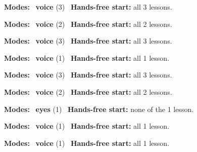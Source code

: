 \expandafter\def\csname hlchaptermodality105\endcsname{%
  {\small\noindent
    \textbf{Modes:} \hlvoicesign{}~\textbf{voice} (3)\quad
    \hlvoicesign{}~\textbf{Hands-free start:} all 3 lessons.%
    \par}\medskip
}

\expandafter\def\csname hlchaptermodality106\endcsname{%
  {\small\noindent
    \textbf{Modes:} \hlvoicesign{}~\textbf{voice} (2)\quad
    \hlvoicesign{}~\textbf{Hands-free start:} all 2 lessons.%
    \par}\medskip
}

\expandafter\def\csname hlchaptermodality107\endcsname{%
  {\small\noindent
    \textbf{Modes:} \hlvoicesign{}~\textbf{voice} (3)\quad
    \hlvoicesign{}~\textbf{Hands-free start:} all 3 lessons.%
    \par}\medskip
}

\expandafter\def\csname hlchaptermodality108\endcsname{%
  {\small\noindent
    \textbf{Modes:} \hlvoicesign{}~\textbf{voice} (1)\quad
    \hlvoicesign{}~\textbf{Hands-free start:} all 1 lesson.%
    \par}\medskip
}

\expandafter\def\csname hlchaptermodality109\endcsname{%
  {\small\noindent
    \textbf{Modes:} \hlvoicesign{}~\textbf{voice} (3)\quad
    \hlvoicesign{}~\textbf{Hands-free start:} all 3 lessons.%
    \par}\medskip
}

\expandafter\def\csname hlchaptermodality110\endcsname{%
  {\small\noindent
    \textbf{Modes:} \hlvoicesign{}~\textbf{voice} (2)\quad
    \hlvoicesign{}~\textbf{Hands-free start:} all 2 lessons.%
    \par}\medskip
}

\expandafter\def\csname hlchaptermodality111\endcsname{%
  {\small\noindent
    \textbf{Modes:} \hlsightsign{}~\textbf{eyes} (1)\quad
    \hlvoicesign{}~\textbf{Hands-free start:} none of the 1 lesson.%
    \par}\medskip
}

\expandafter\def\csname hlchaptermodality112\endcsname{%
  {\small\noindent
    \textbf{Modes:} \hlvoicesign{}~\textbf{voice} (1)\quad
    \hlvoicesign{}~\textbf{Hands-free start:} all 1 lesson.%
    \par}\medskip
}

\expandafter\def\csname hlchaptermodality113\endcsname{%
  {\small\noindent
    \textbf{Modes:} \hlvoicesign{}~\textbf{voice} (1)\quad
    \hlvoicesign{}~\textbf{Hands-free start:} all 1 lesson.%
    \par}\medskip
}

